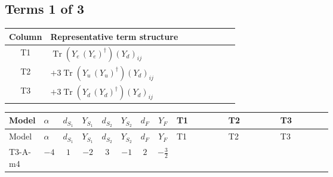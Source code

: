 \documentclass[8pt]{article}
\begin{document}
\begin{landscape}
\subsection*{Terms 1 of 3}
\begin{center}
\begin{tabular}{@{}c >{\raggedright\arraybackslash}p{0.82\linewidth}@{}}
\toprule
Column & Representative term structure \\
\midrule
T1 & \(\displaystyle \operatorname{Tr}\!\left({Y_e}\,\left({Y_e}\right)^{\dagger}\right) \left({Y_d}\right)_{ij}\) \\
\midrule
T2 & \(\displaystyle +3 \operatorname{Tr}\!\left({Y_u}\,\left({Y_u}\right)^{\dagger}\right) \left({Y_d}\right)_{ij}\) \\
\midrule
T3 & \(\displaystyle +3 \operatorname{Tr}\!\left({Y_d}\,\left({Y_d}\right)^{\dagger}\right) \left({Y_d}\right)_{ij}\) \\
\midrule
\bottomrule
\end{tabular}
\end{center}
\smallskip
\tiny
\begin{longtable}{@{}llcccccc >{\raggedright\arraybackslash}p{0.21\linewidth} >{\raggedright\arraybackslash}p{0.21\linewidth} >{\raggedright\arraybackslash}p{0.21\linewidth}@{}}
\toprule
Model & $\alpha$ & $d_{S_1}$ & $Y_{S_1}$ & $d_{S_2}$ & $Y_{S_2}$ & $d_F$ & $Y_F$ & T1 & T2 & T3 \\
\midrule
\endfirsthead
\toprule
Model & $\alpha$ & $d_{S_1}$ & $Y_{S_1}$ & $d_{S_2}$ & $Y_{S_2}$ & $d_F$ & $Y_F$ & T1 & T2 & T3 \\
\midrule
\endhead
T3-A-m4 & $-4$ & $1$ & $-2$ & $3$ & $-1$ & $2$ & $-\frac{3}{2}$ & \scriptsize\adjustbox{max width=\linewidth}{$\begin{gathered} \operatorname{Tr}\!\left({Y_e}\,\left({Y_e}\right)^{\dagger}\right) \left({Y_d}\right)_{ij}\end{gathered}$} & \scriptsize\adjustbox{max width=\linewidth}{$\begin{gathered} +3 \operatorname{Tr}\!\left({Y_u}\,\left({Y_u}\right)^{\dagger}\right) \left({Y_d}\right)_{ij}\end{gathered}$} & \scriptsize\adjustbox{max width=\linewidth}{$\begin{gathered} +3 \operatorname{Tr}\!\left({Y_d}\,\left({Y_d}\right)^{\dagger}\right) \left({Y_d}\right)_{ij}\end{gathered}$} \\
\midrule

\end{longtable}
\end{landscape}
\end{document}
